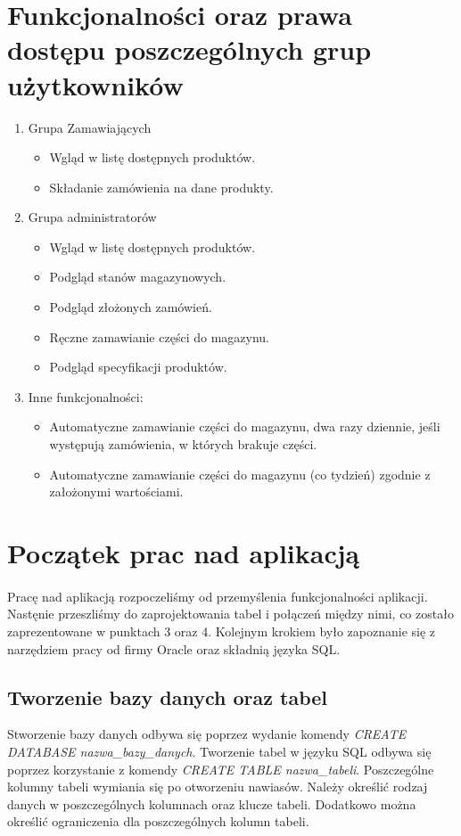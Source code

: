 \documentclass{article}
\begin{document}
\section{Funkcjonalności oraz prawa dostępu poszczególnych grup użytkowników}
\begin{enumerate}
   \item Grupa Zamawiających
         \begin{itemize}
            \item Wgląd w listę dostępnych produktów.
            \item Składanie zamówienia na dane produkty.
         \end{itemize}
   \item Grupa administratorów
         \begin{itemize}
            \item Wgląd w listę dostępnych produktów.
            \item Podgląd stanów magazynowych.
            \item Podgląd złożonych zamówień.
            \item Ręczne zamawianie części do magazynu.
            \item Podgląd specyfikacji produktów.
         \end{itemize}
   \item Inne funkcjonalności:
         \begin{itemize}
            \item Automatyczne zamawianie części do magazynu, dwa razy dziennie, jeśli występują
            zamówienia, w których brakuje części. 
            \item Automatyczne zamawianie części do magazynu (co tydzień) zgodnie z założonymi wartościami.     \end{itemize}
\end{enumerate}
\newpage
\section{Początek prac nad aplikacją}
\paragraph{}
Pracę nad aplikacją rozpoczeliśmy od przemyślenia funkcjonalności aplikacji.
Nastęnie przeszliśmy do zaprojektowania tabel i połączeń między
nimi, co zostało zaprezentowane w punktach 3 oraz 4. Kolejnym krokiem było
zapoznanie się z narzędziem pracy od firmy Oracle oraz składnią języka SQL.
\subsection{Tworzenie bazy danych oraz tabel}
Stworzenie bazy danych odbywa się poprzez wydanie komendy \textit{CREATE
   DATABASE nazwa\_bazy\_danych}. Tworzenie tabel w języku SQL odbywa się poprzez korzystanie z komendy
\textit{CREATE TABLE nazwa\_tabeli}. Poszczególne kolumny tabeli wymiania się po
otworzeniu nawiasów. Należy określić rodzaj danych w poszczególnych kolumnach
oraz klucze tabeli. Dodatkowo można określić ograniczenia dla poszczególnych
kolumn tabeli.
\end{document}
